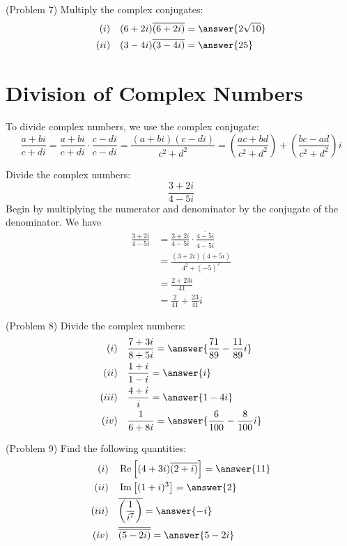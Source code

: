 \documentclass[handout]{ximera}
\begin{document}
\begin{problem}(Problem 7)
Multiply the complex conjugates:
\begin{align*}
(i)& \quad (6+2i) \overline{(6+2i)} = \answer{2\sqrt{10}} \\
(ii)& \quad (3-4i) \overline {(3-4i)} = \answer{25}
\end{align*}
\end{problem}


\section{Division of Complex Numbers}
To divide complex numbers, we use the complex conjugate:
\[
\frac{a+bi}{c+di} = \frac{a+bi}{c+di}\cdot\frac{c-di}{c-di} = \frac{(a+bi)(c-di)}{c^2 + d^2} = \left(\frac{ac+bd}{c^2 + d^2}\right) + \left(\frac{bc-ad}{c^2 + d^2}\right)i
\]


\begin{example}[Example 8]
Divide the complex numbers:
\[
\frac{3+2i}{4-5i} 
\]
Begin by multiplying the numerator and denominator by the conjugate of the denominator.
We have
\begin{align*}
\frac{3+2i}{4-5i} &= \frac{3+2i}{4-5i} \cdot \frac{{\overline{4-5i}}}{{\overline{4-5i}}} \\
                  &= \frac{(3+2i)(4+5i)}{4^2 +(-5)^2}\\
                  &= \frac{2+23i}{41}\\
                  &= \frac{2}{41} + \frac{23}{41}i
\end{align*}
\end{example}


\begin{problem}(Problem 8)
Divide the complex numbers:
\begin{align*}
(i)& \quad  \frac{7+3i}{8+5i} = \answer{\frac{71}{89} -\frac{11}{89}i}\\
(ii)& \quad\frac{1+i}{1-i} = \answer{i}\\
(iii)& \quad\frac{4+i}{i} = \answer{1-4i}\\
(iv)& \quad\frac{1}{6+8i} = \answer{\frac{6}{100} - \frac{8}{100}i}
\end{align*}
\end{problem}


\begin{problem}(Problem 9)
Find the following quantities:
\begin{align*}
(i)& \quad \Rep\left[(4+3i)\overline{(2+i)}\right] = \answer{11}\\
(ii)& \quad \Imp\left[(1+i)^3\right] = \answer{2}\\
(iii)& \quad \overline{\left(\frac{1}{i^7}\right)} = \answer{-i}\\
(iv)& \quad \overline{\overline{(5-2i)}} = \answer{5-2i}
\end{align*}
\end{problem}
\end{document}

